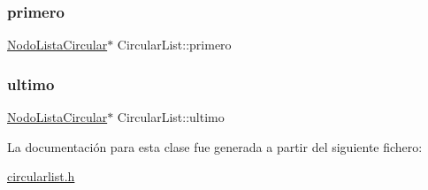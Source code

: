 \mbox{\label{class_circular_list_aed38c338f4196ea0eb66f3990b7f3bc8}} 
\subsubsection{\texorpdfstring{primero}{primero}}
{\footnotesize\ttfamily \mbox{\hyperlink{class_nodo_lista_circular}{Nodo\+Lista\+Circular}}$\ast$ Circular\+List\+::primero}

\mbox{\label{class_circular_list_a45e599ae210b5ebc41a5cd9149bce79e}} 
\subsubsection{\texorpdfstring{ultimo}{ultimo}}
{\footnotesize\ttfamily \mbox{\hyperlink{class_nodo_lista_circular}{Nodo\+Lista\+Circular}}$\ast$ Circular\+List\+::ultimo}



La documentación para esta clase fue generada a partir del siguiente fichero\+:\begin{DoxyCompactItemize}
\item 
\mbox{\hyperlink{circularlist_8h}{circularlist.\+h}}\end{DoxyCompactItemize}
